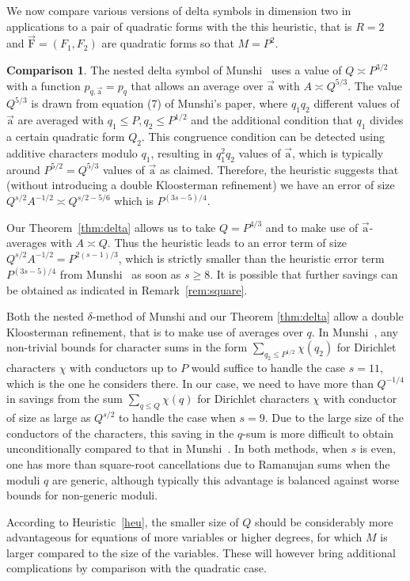 \documentclass[letterpaper,11pt]{amsart}
\numberwithin{equation}{section}
\theoremstyle{definition}
\newtheorem{example}{Comparison}
\numberwithin{equation}{section}
\newcommand{\ua}{\vec{\mathrm{a}}}
\newcommand{\uF}{{\vec{\mathrm{F}} }}
\begin{document}
We now compare various versions of delta symbols in dimension two in applications to a pair of quadratic forms with the this heuristic, that is $R=2$ and $\uF=(F_1, F_2)$ are quadratic forms so that $M=P^2$.

\begin{example} \label{eg:GRH}
The nested delta symbol of Munshi~\cite{M} uses a value of $Q\asymp P^{3/2}$ with a function $p_{q, \ua}=p_q$ that allows an average over $\ua$ with $A\asymp Q^{5/3}$. The value $Q^{5/3}$ is drawn from equation (7) of Munshi's paper, where $q_1 q_2 $ different values of $\ua$ are averaged with \(q_1\leq P, q_2\leq P^{1/2}\) and the additional condition that $q_1$ divides a certain quadratic form $Q_2$. This congruence condition can be detected using additive characters modulo $q_1$, resulting in $q_1^2q_2 $ values of \(\ua\), which is typically around $P^{5/2}=Q^{5/3}$ values of \(\ua\) as claimed. Therefore, the heuristic suggests that (without introducing a double Kloosterman refinement) we have an error of size $Q^{s/2} A^{-1/2} \asymp Q^{s/2-5/6}$ which is $P^{(3s-5)/4}$.

Our Theorem~\ref{thm:delta} allows us to take $Q=P^{4/3}$ and to make use of $\ua$-averages with $A\asymp Q$. Thus the heuristic leads to an error term of size $Q^{s/2}A^{-1/2}=P^{2(s-1)/3}$, which is strictly smaller than the heuristic error term $P^{(3s-5)/4}$ from Munshi~\cite{M} as soon as $s\geq 8$.
It is possible that further savings can be obtained as indicated in Remark~\ref{rem:square}.



   
Both the nested $\delta$-method of Munshi and our Theorem \ref{thm:delta} allow a double Kloosterman refinement, that is to make use of averages over $q$. In 
Munshi~\cite{M}, any non-trivial bounds for character sums in the form $\sum_{q_2\leq P^{1/2}}\chi(q_2)$ for Dirichlet characters $\chi$ with conductors up to $P$ would suffice to handle the case $s=11$, which is the one he considers there. In our case, we need to have more than $Q^{-1/4}$ in savings from the sum $\sum_{q\leq Q}\chi(q)$ for Dirichlet characters $\chi$ with conductor of size as large as $Q^{s/2}$ to handle the case when $s=9$. Due to the large size of the conductors of the characters, this saving in the $q$-sum is more difficult to obtain unconditionally compared to that in Munshi~\cite{M}. In both methods, when $s$ is even, one has more than square-root cancellations due to Ramanujan sums when the moduli $q$ are generic, although typically this advantage is balanced against worse bounds for non-generic moduli.

According to Heuristic~\ref{heu}, the smaller size of $Q$ should be considerably more advantageous for equations of more variables or higher degrees, for which $M$ is larger compared to the size of the variables. These will however bring additional complications by comparison with the quadratic case.
\end{example}
\end{document}
